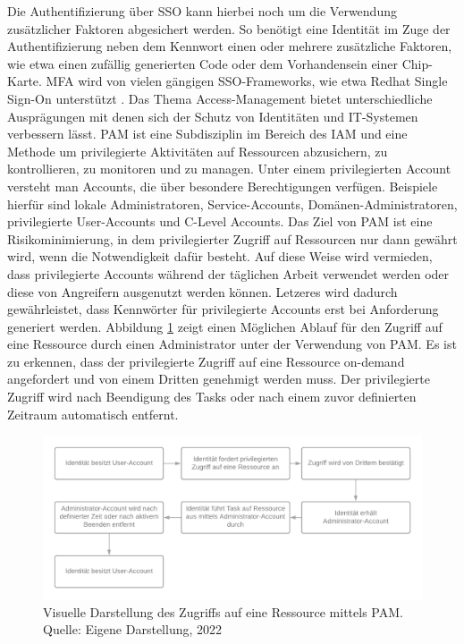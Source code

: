 Die Authentifizierung über SSO kann hierbei noch um die Verwendung zusätzlicher Faktoren abgesichert werden. So benötigt eine Identität im Zuge der Authentifizierung neben dem Kennwort einen oder mehrere zusätzliche Faktoren, wie etwa einen zufällig generierten Code oder dem Vorhandensein einer Chip-Karte. MFA wird von vielen gängigen SSO-Frameworks, wie etwa \glqq{}Redhat Single Sign-On\grqq{} unterstützt \autocite{RedHat_SSO}. 
\bigbreak
Das Thema Access-Management bietet unterschiedliche Ausprägungen mit denen sich der Schutz von Identitäten und IT-Systemen verbessern lässt. PAM ist eine Subdisziplin im Bereich des IAM und eine Methode um privilegierte Aktivitäten auf Ressourcen abzusichern, zu kontrollieren, zu monitoren und zu managen. Unter einem privilegierten Account versteht man Accounts, die über besondere Berechtigungen verfügen. Beispiele hierfür sind lokale Administratoren, Service-Accounts, Domänen-Administratoren, privilegierte User-Accounts und C-Level Accounts. Das Ziel von PAM ist eine Risikominimierung, in dem privilegierter Zugriff auf Ressourcen nur dann gewährt wird, wenn die Notwendigkeit dafür besteht. Auf diese Weise wird vermieden, dass privilegierte Accounts während der täglichen Arbeit verwendet werden oder diese von Angreifern ausgenutzt werden können. Letzeres wird dadurch gewährleistet, dass Kennwörter für privilegierte Accounts erst bei Anforderung generiert werden. Abbildung \ref{fig:best-practice PAM} zeigt einen Möglichen Ablauf für den Zugriff auf eine Ressource durch einen Administrator unter der Verwendung von PAM. Es ist zu erkennen, dass der privilegierte Zugriff auf eine Ressource on-demand angefordert und von einem Dritten genehmigt werden muss. Der privilegierte Zugriff wird nach Beendigung des Tasks oder nach einem zuvor definierten Zeitraum automatisch entfernt. \autocite{rolls_haber_2020} 

\begin{figure}[H]
    \centering
  \includegraphics[width=\linewidth]{images/uploads/a_figure_07.png}
  \caption{Visuelle Darstellung des Zugriffs auf eine Ressource mittels PAM. Quelle: Eigene Darstellung, 2022}
  \label{fig:best-practice PAM}
\end{figure}

